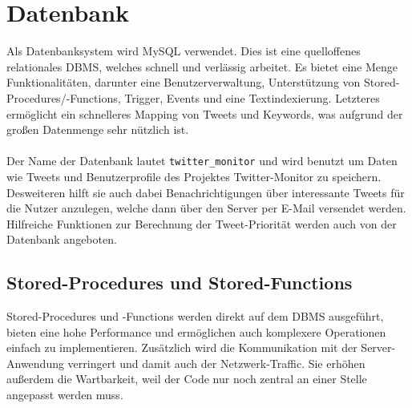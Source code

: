 \section{Datenbank}

Als Datenbanksystem wird MySQL verwendet. Dies ist eine quelloffenes relationales \ac{DBMS}, welches schnell und verlässig arbeitet. Es bietet eine Menge Funktionalitäten, darunter eine Benutzerverwaltung, Unterstützung von Stored-Procedures/-Functions, Trigger, Events und eine Textindexierung. Letzteres ermöglicht ein schnelleres Mapping von Tweets und Keywords, was aufgrund der großen Datenmenge sehr nützlich ist.
\\\\
Der Name der Datenbank lautet \texttt{twitter\_monitor} und wird benutzt um Daten wie Tweets und 
Benutzerprofile des Projektes Twitter-Monitor zu speichern. Desweiteren hilft sie auch dabei 
Benachrichtigungen über interessante Tweets für die Nutzer anzulegen, welche dann über den Server 
per E-Mail versendet werden. Hilfreiche Funktionen zur Berechnung der Tweet-Priorität werden auch
von der Datenbank angeboten. 

\subsection{Stored-Procedures und Stored-Functions}

Stored-Procedures und -Functions werden direkt auf dem \acs{DBMS} ausgeführt, bieten eine hohe Performance und ermöglichen auch komplexere Operationen einfach zu implementieren. Zusätzlich wird die Kommunikation mit der Server-Anwendung verringert und damit auch der Netzwerk-Traffic. Sie erhöhen außerdem die Wartbarkeit, weil der Code nur noch zentral an einer Stelle angepasst werden muss.

